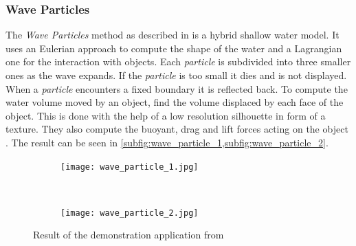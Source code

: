 \subsubsection{Wave Particles}\label{subsub:wave_particles}

The \textit{Wave Particles} method as described in \autocite{yuksel2007wave} is
a hybrid shallow water model. It uses an Eulerian approach to compute the shape
of the water and a Lagrangian one for the interaction with objects. Each
\textit{particle} is subdivided into three smaller ones as the wave expands. If
the \textit{particle} is too small it dies and is not displayed. When a
\textit{particle} encounters a fixed boundary it is reflected back. To compute
the water volume moved by an object, \citeauthor{yuksel2007wave} find the volume
displaced by each face of the object. This is done with the help of a low
resolution silhouette in form of a texture. They also compute the buoyant, drag
and lift forces acting on the object \autocite{yuksel2007wave}. The result can
be seen in \cref{subfig:wave_particle_1,subfig:wave_particle_2}.

\begin{figure}[hbt!]
    \centering
    \begin{subfigure}[hbt]{\textwidth}
        \centering
        \texttt{[image: wave\_particle\_1.jpg]}
        \label{subfig:wave_particle_1}
    \end{subfigure}\\%
    \begin{subfigure}[hbt]{\textwidth}
        \centering
        \texttt{[image: wave\_particle\_2.jpg]}
        \label{subfig:wave_particle_2}
    \end{subfigure}
    \caption{Result of the demonstration application from
    \autocite{yuksel2007wave}}\label{fig:wave_particle}
\end{figure}

